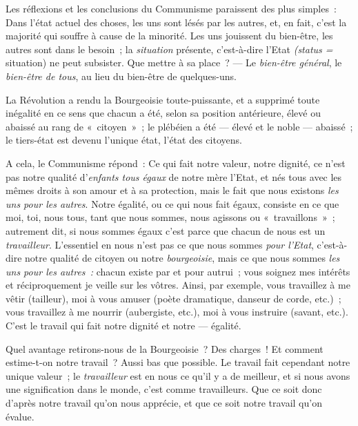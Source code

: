 \documentclass[french,twoside]{book} %
\begin{document}
Les réflexions et les conclusions du Communisme paraissent des plus simples : Dans l’état actuel des choses, les uns sont lésés par les autres, et, en fait, c’est la majorité qui souffre à cause de la minorité. Les uns jouissent du bien-être, les autres sont dans le besoin ; la \emph{situation} présente, c’est-à-dire l’Etat \emph{(status = }situation) ne peut subsister. Que mettre à sa place ? — Le \emph{bien-être général}, le \emph{bien-être de tous}, au lieu du bien-être de quelques-uns.\par
La Révolution a rendu la Bourgeoisie toute-puissante, et a supprimé toute inégalité en ce sens que chacun a été, selon sa position antérieure, élevé ou abaissé au rang de « citoyen » ; le plébéien a été — élevé et le noble — abaissé ; le tiers-état est devenu l’unique état, l’état des citoyens.\par
A cela, le Communisme répond : Ce qui fait notre valeur, notre dignité, ce n’est pas notre qualité d’\emph{enfants tous égaux} de notre mère l’Etat, et nés tous avec les mêmes droits à son amour et à sa protection, mais le fait que nous existons \emph{les uns pour les autres}. Notre égalité, ou ce qui nous fait égaux, consiste en ce que moi, toi, nous tous, tant que nous sommes, nous agissons ou « travaillons » ; autrement dit, si nous sommes égaux c’est parce que chacun de nous est un \emph{travailleur}. L’essentiel en nous n’est pas ce que nous sommes \emph{pour l’Etat}, c’est-à-dire notre qualité de citoyen ou notre \emph{bourgeoisie}, mais ce que nous sommes \emph{les uns pour les autres :} chacun existe par et pour autrui ; vous soignez mes intérêts et réciproquement je veille sur les vôtres. Ainsi, par exemple, vous travaillez à me vêtir (tailleur), moi à vous amuser  (poète dramatique, danseur de corde, etc.) ; vous travaillez à me nourrir (aubergiste, etc.), moi à vous instruire (savant, etc.). C’est le travail qui fait notre dignité et notre — égalité.\par
Quel avantage retirons-nous de la Bourgeoisie ? Des charges ! Et comment estime-t-on notre travail ? Aussi bas que possible. Le travail fait cependant notre unique valeur ; le \emph{travailleur} est en nous ce qu’il y a de meilleur, et si nous avons une signification dans le monde, c’est comme travailleurs. Que ce soit donc d’après notre travail qu’on nous apprécie, et que ce soit notre travail qu’on évalue.\par
\end{document}
